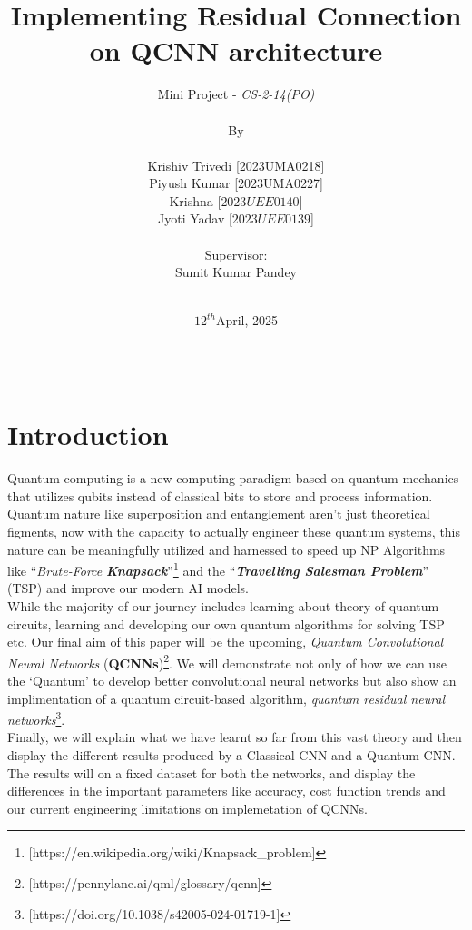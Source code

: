 \documentclass[a4paper]{article}
\title{Implementing Residual Connection on QCNN architecture}
\author{
Mini Project - \emph{CS-2-14(PO)}  \\\\  \small{By} \\\\  Krishiv Trivedi\hspace{0.2cm} [2023UMA0218] \\ Piyush Kumar \hspace{0.193cm} [2023UMA0227] \\ Krishna \hspace{1.58cm}[$2023UEE0140$] \\ Jyoti Yadav \hspace{0.86cm}[$2023UEE0139$] \\\\ \small{Supervisor:} \\ Sumit Kumar Pandey \\ \hspace{0.94cm}\\
}
\date{$12^{th}$April, 2025}
\begin{document}
\maketitle
\hrule
\section*{Introduction}
Quantum computing is a new computing paradigm based on quantum
mechanics that utilizes qubits instead of classical bits to store and process
information. Quantum nature like superposition and entanglement aren't just theoretical figments, now with the capacity to actually engineer these quantum systems, this nature can be meaningfully utilized and harnessed to speed up NP Algorithms like ``\emph{Brute-Force} \emph{\textbf{Knapsack}}''\footnote{[https://en.wikipedia.org/wiki/Knapsack\_problem]} and the ``\emph{\textbf{Travelling Salesman Problem}}'' (TSP) and improve our modern AI models.\\

 While the majority of our journey includes learning about theory of quantum circuits, learning and developing our own quantum algorithms for solving TSP etc. Our final aim of this paper will be the upcoming, \emph{Quantum Convolutional Neural Networks} (\textbf{QCNNs})\footnote{[https://pennylane.ai/qml/glossary/qcnn]}. We will demonstrate not only of how we can use the `Quantum' to develop better convolutional neural networks but also show an implimentation of a quantum circuit-based algorithm, \emph{quantum residual neural networks}\footnote{[https://doi.org/10.1038/s42005-024-01719-1]}.\\

Finally, we will explain what we have learnt so far from this vast theory and then display the different results produced by a Classical CNN and a Quantum CNN. The results will on a fixed dataset for both the networks, and display the differences in the important parameters like accuracy, cost function trends and our current engineering limitations on implemetation of QCNNs.
\end{document}
